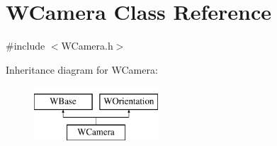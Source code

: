 \hypertarget{class_w_camera}{}\section{W\+Camera Class Reference}
\label{class_w_camera}


{\ttfamily \#include $<$W\+Camera.\+h$>$}

Inheritance diagram for W\+Camera\+:\begin{figure}[H]
\begin{center}
\leavevmode
\includegraphics[height=2.000000cm]{class_w_camera}
\end{center}
\end{figure}
